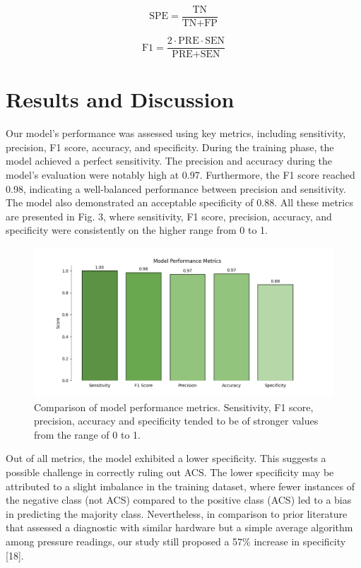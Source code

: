 \documentclass{article}
\begin{document}
\begin{equation}
    \text{SPE} = \frac{\text{TN}}{\text{TN} + \text{FP}}
\end{equation}

\begin{equation}
    \text{F1} = \frac{2 \cdot \text{PRE} \cdot \text{SEN}}{\text{PRE} + \text{SEN}}
\end{equation}

\section{Results and Discussion}
Our model's performance was assessed using key metrics, including sensitivity, precision, F1 score, accuracy, and specificity. During the training phase, the model achieved a perfect sensitivity. The precision and accuracy during the model's evaluation were notably high at 0.97. Furthermore, the F1 score reached 0.98, indicating a well-balanced performance between precision and sensitivity. The model also demonstrated an acceptable specificity of 0.88. All these metrics are presented in Fig. 3, where sensitivity, F1 score, precision, accuracy, and specificity were consistently on the higher range from 0 to 1.

\begin{figure}[H] %
    \centering
    \includegraphics[width=0.7\linewidth]{performance.png}
    \caption{Comparison of model performance metrics. Sensitivity, F1 score, precision, accuracy and specificity tended to be of stronger values from the range of 0 to 1.}
    \label{fig:fig3}
\end{figure}

Out of all metrics, the model exhibited a lower specificity. This suggests a possible challenge in correctly ruling out ACS. The lower specificity may be attributed to a slight imbalance in the training dataset, where fewer instances of the negative class (not ACS) compared to the positive class (ACS) led to a bias in predicting the majority class. Nevertheless, in comparison to prior literature that assessed a diagnostic with similar hardware but a simple average algorithm among pressure readings, our study still proposed a 57\% increase in specificity [18]. 
\end{document}
